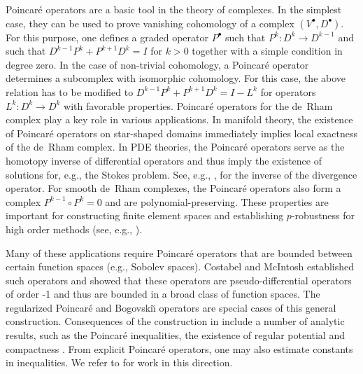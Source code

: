 \documentclass[11pt]{amsart}
\newcommand{\0}{\mathaccent23}
\newcommand{\bs}{{\scriptscriptstyle \bullet}}
\begin{document}
Poincar\'e operators are a basic tool in the theory of complexes. In the simplest case, they can be used to prove vanishing cohomology of a complex $(V^{\bs}, D^{\bs})$. For this purpose, one defines a graded operator $P^{\bs}$ such that $P^k:D^k\to D^{k-1}$ and such that $D^{k-1}P^{k}+P^{k+1}D^{k}=I$ for $k>0$  together with a simple condition in degree zero. In the case of non-trivial cohomology, a Poincar\'e operator determines a subcomplex with isomorphic cohomology. For this case, the above relation has to be modified to $D^{k-1}P^{k}+P^{k+1}D^{k}=I-L^k$ for operators $L^k:D^k\to D^k$ with favorable properties. Poincar\'e operators for the de~Rham complex play a key role in various applications.  In manifold theory, the existence of Poincar\'e operators on star-shaped domains immediately implies local exactness of the de~Rham complex. In PDE theories, the Poincar\'e operators serve as the homotopy inverse of differential operators and thus imply the existence of solutions for, e.g., the Stokes problem. See, e.g., \cite{acosta2017divergence,danchin2012divergence}, for the inverse of the divergence operator. For smooth de~Rham complexes, the Poincar\'e operators also form a complex $P^{k-1}\circ P^{k}=0$ and are polynomial-preserving. These properties are important for constructing finite element spaces \cite{arnold2006defferential,christiansen2018generalized,christiansen2019finite,hiptmair1999canonical,hu2022oberwolfach,hu2020simple,hu2022family} and establishing $p$-robustness for high order methods (see, e.g.,  \cite{bespalov2010convergence,ern2015polynomial}).

Many of these applications require Poincar\'e operators that are bounded between certain function spaces (e.g., Sobolev spaces).  Costabel and McIntosh \cite{costabel2010bogovskiui} established such operators and showed that these operators are pseudo-differential operators of order -1 and thus are bounded in a broad class of function spaces. The regularized Poincar\'e and Bogovski\u{\i} operators are special cases of this general construction. Consequences of the construction in \cite{costabel2010bogovskiui} include a number of analytic results, such as the Poincar\'e inequalities, the existence of regular potential and compactness \cite[Section 2]{arnold2021complexes}.  From explicit Poincar\'e operators,  one may also estimate constants in inequalities. We refer to \cite{guzman2020estimation} for work in this direction. 



\end{document}
